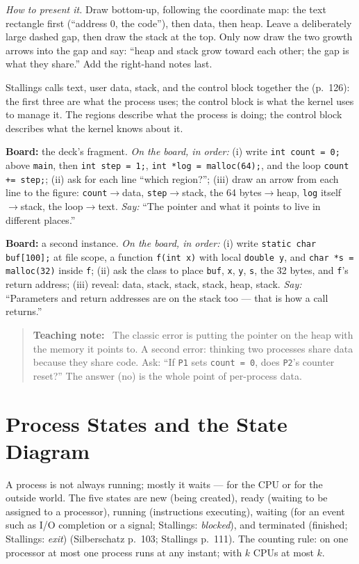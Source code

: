 \documentclass[11pt]{article}
\newenvironment{teachingaside}{\begin{quote}\small\color{primary-gold}\textbf{Teaching note:}\ }{\end{quote}}
\begin{document}
\emph{How to present it.} Draw bottom-up, following the coordinate map: the text rectangle first (``address 0, the code''), then data, then heap. Leave a deliberately large dashed gap, then draw the stack at the top. Only now draw the two growth arrows into the gap and say: ``heap and stack grow toward each other; the gap is what they share.'' Add the right-hand notes last.

Stallings calls text, user data, stack, and the control block together the  (p.~126): the first three are what the process uses; the control block is what the kernel uses to manage it. The regions describe what the process is doing; the control block describes what the kernel knows about it.

\textbf{Board:} the deck's fragment. \emph{On the board, in order:} (i) write \texttt{int count = 0;} above \texttt{main}, then \texttt{int step = 1;}, \texttt{int *log = malloc(64);}, and the loop \texttt{count += step;}; (ii) ask for each line ``which region?''; (iii) draw an arrow from each line to the figure: \texttt{count}$\to$data, \texttt{step}$\to$stack, the 64 bytes$\to$heap, \texttt{log} itself$\to$stack, the loop$\to$text. \emph{Say:} ``The pointer and what it points to live in different places.''

\textbf{Board:} a second instance. \emph{On the board, in order:} (i) write \texttt{static char buf[100];} at file scope, a function \texttt{f(int x)} with local \texttt{double y}, and \texttt{char *s = malloc(32)} inside \texttt{f}; (ii) ask the class to place \texttt{buf}, \texttt{x}, \texttt{y}, \texttt{s}, the 32 bytes, and \texttt{f}'s return address; (iii) reveal: data, stack, stack, stack, heap, stack. \emph{Say:} ``Parameters and return addresses are on the stack too --- that is how a call returns.''

\begin{teachingaside}
The classic error is putting the pointer on the heap with the memory it points to. A second error: thinking two processes share data because they share code. Ask: ``If \texttt{P1} sets \texttt{count = 0}, does \texttt{P2}'s counter reset?'' The answer (no) is the whole point of per-process data.
\end{teachingaside}

\section{Process States and the State Diagram}

A process is not always running; mostly it waits --- for the CPU or for the outside world. The five states are new (being created), ready (waiting to be assigned to a processor), running (instructions executing), waiting (for an event such as I/O completion or a signal; Stallings: \emph{blocked}), and terminated (finished; Stallings: \emph{exit}) (Silberschatz p.~103; Stallings p.~111). The counting rule: on one processor at most one process runs at any instant; with $k$ CPUs at most $k$.
\end{document}
